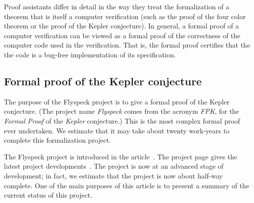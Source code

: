\documentclass[11pt]{amsart}
\begin{document}
Proof assistants differ in detail in the way they treat the formalization
of  a theorem that is itself a computer verification (such as
the proof of the four color theorem or the proof of the Kepler conjecture).
In general, a formal proof of a computer verification can be viewed
as a formal proof of the correctness of the computer code used in the
verification.  That is, the formal proof certifies that the the code
is a bug-free implementation of its specification.





\subsection*{Formal proof of the Kepler conjecture}
\label{sec:intro}

The purpose of the Flyspeck project is to give a formal proof of the Kepler conjecture.  (The project name {\it Flyspeck} comes from the acronym {\it FPK}, for the {\it Formal} {\it Proof} of the {\it Kepler} conjecture.)  This is the most complex formal proof ever undertaken.  We estimate that it may take about twenty work-years to complete this formalization project.  

The Flyspeck project is introduced in the article~\cite{hales:DSP:2006:432}.
The project page gives the latest project developments~\cite{website:FlyspeckProject}.
The project is now at an advanced stage of development; in fact, we estimate that the project is now about half-way complete.  
One of the main purposes of this article is to present a summary of the current status of this project.
\end{document}
